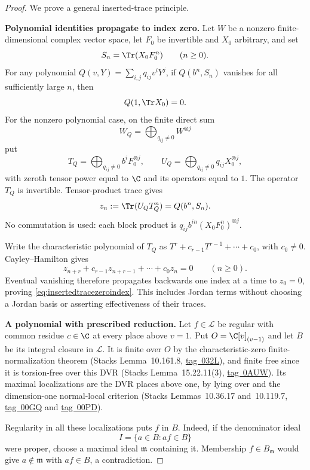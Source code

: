 \begin{proof}
We prove a general inserted-trace principle.

\par\smallskip\noindent\textbf{Polynomial identities propagate to index zero.}\quad
Let $W$ be a nonzero finite-dimensional complex vector
space, let $F_0$ be invertible and $X_0$ arbitrary, and set
\[
 S_n=\Tr(X_0F_0^n)\qquad(n\ge0).
\]
For any polynomial
$Q(v,Y)=\sum_{i,j}q_{ij}v^iY^j$, if $Q(b^n,S_n)$
vanishes for all sufficiently large $n$, then
\begin{equation}\label{eq:insertedtracezeroindex}
 Q(1,\Tr X_0)=0.
\end{equation}
For the nonzero polynomial case, on the finite direct sum
\[
 W_Q=\bigoplus_{q_{ij}\ne0}W^{\otimes j}
\]
put
\[
 T_Q=\bigoplus_{q_{ij}\ne0}b^iF_0^{\otimes j},
 \qquad
 U_Q=\bigoplus_{q_{ij}\ne0}q_{ij}X_0^{\otimes j},
\]
with zeroth tensor power equal to $\C$ and its
operators equal to $1$.
The operator $T_Q$ is invertible.
Tensor-product trace gives
\[
 z_n:=\Tr(U_QT_Q^n)=Q(b^n,S_n).
\]
No commutation is used: each block product is
$q_{ij}b^{in}(X_0F_0^n)^{\otimes j}$.

Write the characteristic polynomial of $T_Q$ as
$T^r+c_{r-1}T^{r-1}+\cdots+c_0$, with $c_0\ne0$.
Cayley--Hamilton gives
\[
 z_{n+r}+c_{r-1}z_{n+r-1}+\cdots+c_0z_n=0
 \qquad(n\ge0).
\]
Eventual vanishing therefore propagates backwards
one index at a time to $z_0=0$, proving
\eqref{eq:insertedtracezeroindex}.
This includes Jordan terms without choosing a
Jordan basis or asserting effectiveness of their traces.

\par\smallskip\noindent\textbf{A polynomial with prescribed reduction.}\quad
Let $f\in\mathcal L$ be regular with common residue
$c\in\C$ at every place above $v=1$.
Put $O=\C[v]_{(v-1)}$ and let $B$ be its integral closure
in $\mathcal L$.
It is finite over $O$ by the characteristic-zero
finite-normalization theorem
(Stacks Lemma~10.161.8,
\href{https://stacks.math.columbia.edu/tag/032L}{tag~032L}),
and finite free since it is torsion-free over this DVR
(Stacks Lemma~15.22.11(3),
\href{https://stacks.math.columbia.edu/tag/0AUW}{tag~0AUW}).
Its maximal localizations are the DVR places above one,
by lying over and the dimension-one normal-local criterion
(Stacks Lemmas~10.36.17 and~10.119.7,
\href{https://stacks.math.columbia.edu/tag/00GQ}{tag~00GQ}
and
\href{https://stacks.math.columbia.edu/tag/00PD}{tag~00PD}).

Regularity in all these localizations puts $f$ in $B$.
Indeed, if the denominator ideal
\[
 I=\{a\in B:af\in B\}
\]
were proper, choose a maximal ideal $\mathfrak m$
containing it. Membership $f\in B_{\mathfrak m}$
would give $a\notin\mathfrak m$ with $af\in B$,
a contradiction.


\end{proof}
